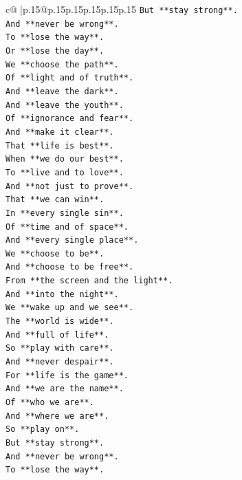 \documentclass{article}
\begin{document}
{\begin{supertabular}{c@{$\;$}|p{.15\linewidth}@{}p{.15\linewidth}p{.15\linewidth}p{.15\linewidth}p{.15\linewidth}p{.15\linewidth}}
{{{\texttt{But **stay strong**.} \\
\texttt{And **never be wrong**.} \\
\texttt{To **lose the way**.} \\
\texttt{Or **lose the day**.} \\
\texttt{We **choose the path**.} \\
\texttt{Of **light and of truth**.} \\
\texttt{And **leave the dark**.} \\
\texttt{And **leave the youth**.} \\
\texttt{Of **ignorance and fear**.} \\
\texttt{And **make it clear**.} \\
\texttt{That **life is best**.} \\
\texttt{When **we do our best**.} \\
\texttt{To **live and to love**.} \\
\texttt{And **not just to prove**.} \\
\texttt{That **we can win**.} \\
\texttt{In **every single sin**.} \\
\texttt{Of **time and of space**.} \\
\texttt{And **every single place**.} \\
\texttt{We **choose to be**.} \\
\texttt{And **choose to be free**.} \\
\texttt{From **the screen and the light**.} \\
\texttt{And **into the night**.} \\
\texttt{We **wake up and we see**.} \\
\texttt{The **world is wide**.} \\
\texttt{And **full of life**.} \\
\texttt{So **play with care**.} \\
\texttt{And **never despair**.} \\
\texttt{For **life is the game**.} \\
\texttt{And **we are the name**.} \\
\texttt{Of **who we are**.} \\
\texttt{And **where we are**.} \\
\texttt{So **play on**.} \\
\texttt{But **stay strong**.} \\
\texttt{And **never be wrong**.} \\
\texttt{To **lose the way**.} \\
}}}
\end{supertabular}}
\end{document}
